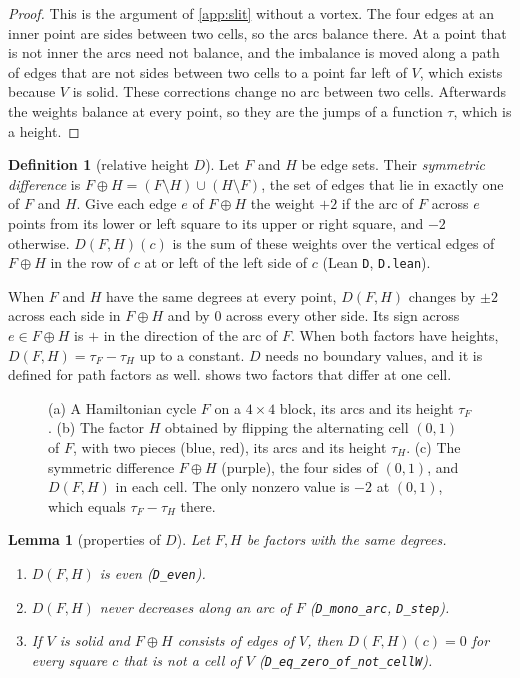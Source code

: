 \documentclass[11pt]{article}
\theoremstyle{plain}
\newtheorem{lemma}[theorem]{Lemma}
\theoremstyle{definition}
\newtheorem{definition}[theorem]{Definition}
\theoremstyle{remark}
\newcommand{\lean}[1]{\texttt{#1}}
\begin{document}
\begin{proof}
This is the argument of \cref{app:slit} without a vortex.
The four edges at an inner point are sides between two cells, so the arcs balance there.
At a point that is not inner the arcs need not balance, and the imbalance is moved along a path of
edges that are not sides between two cells to a point far left of $V$, which exists because $V$ is
solid.
These corrections change no arc between two cells.
Afterwards the weights balance at every point, so they are the jumps of a function $\tau$, which is
a height.
\end{proof}

\begin{definition}[relative height $D$]
\label{def:D}
Let $F$ and $H$ be edge sets.
Their \emph{symmetric difference} is $F\oplus H=(F\setminus H)\cup(H\setminus F)$, the set of
edges that lie in exactly one of $F$ and $H$.
Give each edge $e$ of $F\oplus H$ the weight $+2$ if the arc of $F$ across $e$ points from its
lower or left square to its upper or right square, and $-2$ otherwise.
$D(F,H)(c)$ is the sum of these weights over the vertical edges of $F\oplus H$ in the row of
$c$ at or left of the left side of $c$ (Lean \lean{D}, \lean{D.lean}).
\end{definition}

When $F$ and $H$ have the same degrees at every point, $D(F,H)$ changes by $\pm2$ across each side
in $F\oplus H$ and by $0$ across every other side.
Its sign across $e\in F\oplus H$ is $+$ in the direction of the arc of $F$.
When both factors have heights, $D(F,H)=\tau_F-\tau_H$ up to a constant.
$D$ needs no boundary values, and it is defined for path factors as well.
 shows two factors that differ at one cell.

\begin{figure}[t]
\centering

\caption{(a) A Hamiltonian cycle $F$ on a $4\times4$ block, its arcs and its height $\tau_F$.
(b) The factor $H$ obtained by flipping the alternating cell $(0,1)$ of $F$, with two pieces (blue,
red), its arcs
and its height $\tau_H$.
(c) The symmetric difference $F\oplus H$ (purple), the four sides of $(0,1)$, and $D(F,H)$ in each
cell.
The only nonzero value is $-2$ at $(0,1)$, which equals $\tau_F-\tau_H$ there.}
\label{fig:D}
\end{figure}

\begin{lemma}[properties of $D$]
\label{lem:D}
Let $F,H$ be factors with the same degrees.
\begin{enumerate}
\item $D(F,H)$ is even (\lean{D\_even}).
\item $D(F,H)$ never decreases along an arc of $F$ (\lean{D\_mono\_arc}, \lean{D\_step}).
\item If $V$ is solid and $F\oplus H$ consists of edges of $V$, then $D(F,H)(c)=0$ for every
  square $c$ that is not a cell of $V$ (\lean{D\_eq\_zero\_of\_not\_cellW}).
\end{enumerate}
\end{lemma}
\end{document}
